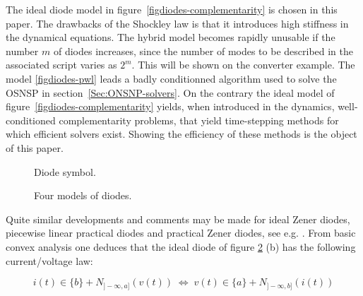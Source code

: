  The ideal diode model in figure~\ref{figdiodes-complementarity} is chosen in this paper. The drawbacks of the Shockley law is that it introduces high stiffness in the dynamical equations. The hybrid model becomes rapidly unusable if the number $m$ of diodes increases, since the number of modes to be described in the associated script varies as $2^{m}$. This will be shown on the converter example. The model \ref{figdiodes-pwl} leads a badly conditionned  algorithm  used to solve the OSNSP in section~\ref{Sec:ONSNP-solvers}. On the contrary the ideal model of figure~\ref{figdiodes-complementarity} yields, when introduced in the dynamics, well-conditioned complementarity problems, that yield time-stepping methods for which efficient solvers exist. Showing the efficiency of these methods is the object of this paper.


\begin{figure}
  \centering
  
  \caption{Diode symbol.}
  \label{fig:DIODE}
\end{figure}

\begin{figure}[!ht]
  \hspace{-2mm}
   \hspace{-2mm}
      \caption{Four models of diodes.}
\label{figdiodes}
\end{figure}



Quite similar developments and comments may be made for ideal Zener diodes, piecewise linear practical diodes and practical Zener diodes, see e.g. \cite{acary-brogliato2008,addi2009}. From basic convex analysis one deduces that the ideal diode of figure \ref{figdiodes} (b) has the following current/voltage law: 

\begin{equation}\label{includiode}
i(t) \in \{b\}+N_{]-\infty,a]}(v(t))\;\Leftrightarrow \; v(t) \in \{a\}+N_{]-\infty,b]}(i(t))
\end{equation} 


